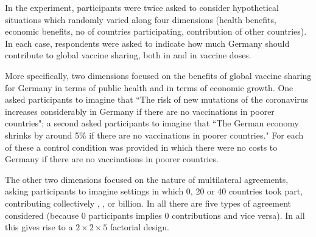 \documentclass[]{article}
\begin{document}

In the experiment, participants were twice  asked to consider hypothetical situations which randomly varied along four dimensions (health benefits, economic benefits, no of countries participating, contribution of other countries). In each case, respondents were asked to indicate how   much Germany should contribute to global vaccine sharing, both in \texteuro  and in vaccine doses.

More specifically, two dimensions focused on the benefits of global vaccine sharing for Germany in terms of public health and in terms of economic growth. One asked participants to imagine that ``The risk of new mutations of the coronavirus increases considerably in Germany if there are no vaccinations in poorer countries"; a second asked participants to imagine that ``The German economy shrinks by around 5\% if there are no vaccinations in poorer countries." For each of these a control condition was provided in which there were no costs to Germany if there are no vaccinations in poorer countries.

The other two dimensions focused on the nature of multilateral agreements, asking participants to imagine settings in which 0, 20 or 40 countries took part, contributing collectively , , or  billion. In all there are five types of agreement considered (because 0 participants implies 0 contributions and vice versa). In all this gives rise to a $2\times2\times5$ factorial design. 


%
% 
\end{document}
